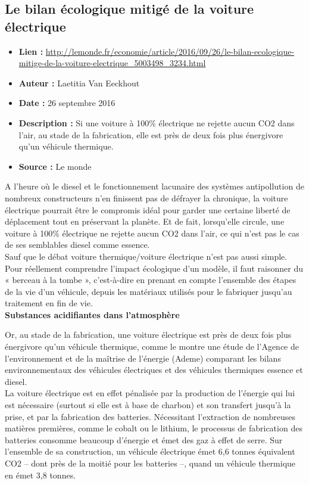 \documentclass[8pt]{article}
\begin{document}
\newpage
\subsection{Le bilan écologique mitigé de la voiture électrique}
 
\begin{itemize}
	\item \textbf{Lien : }  \url{http://lemonde.fr/economie/article/2016/09/26/le-bilan-ecologique-mitige-de-la-voiture-electrique_5003498_3234.html} 
	\item \textbf{Auteur :} Laetitia Van Eeckhout
	\item \textbf{Date : } 26 septembre 2016
	\item \textbf{Description : } Si une voiture à 100\% électrique ne rejette aucun CO2 dans l’air, au stade de la fabrication, elle est près de deux fois plus énergivore qu’un véhicule thermique.
	\item \textbf{Source : } Le monde
\end{itemize}

A l’heure où le diesel et le fonctionnement lacunaire des systèmes antipollution de nombreux constructeurs n’en finissent pas de défrayer la chronique, la voiture électrique pourrait être le compromis idéal pour garder une certaine liberté de déplacement tout en préservant la planète. Et de fait, lorsqu’elle circule, une voiture à 100\% électrique ne rejette aucun CO2 dans l’air, ce qui n’est pas le cas de ses semblables diesel comme essence.  \\

Sauf que le débat voiture thermique/voiture électrique n’est pas aussi simple. Pour réellement comprendre l’impact écologique d’un modèle, il faut raisonner du « berceau à la tombe », c’est-à-dire en prenant en compte l’ensemble des étapes de la vie d’un véhicule, depuis les matériaux utilisés pour le fabriquer jusqu’au traitement en fin de vie.  \\

\textbf{Substances acidifiantes dans l’atmosphère}

Or, au stade de la fabrication, une voiture électrique est près de deux fois plus énergivore qu’un véhicule thermique, comme le montre une étude de l’Agence de l’environnement et de la maîtrise de l’énergie (Ademe) comparant les bilans environnementaux des véhicules électriques et des véhicules thermiques essence et diesel.  \\

La voiture électrique est en effet pénalisée par la production de l’énergie qui lui est nécessaire (surtout si elle est à base de charbon) et son transfert jusqu’à la prise, et par la fabrication des batteries. Nécessitant l’extraction de nombreuses matières premières, comme le cobalt ou le lithium, le processus de fabrication des batteries consomme beaucoup d’énergie et émet des gaz à effet de serre. Sur l’ensemble de sa construction, un véhicule électrique émet 6,6 tonnes équivalent CO2 – dont près de la moitié pour les batteries –, quand un véhicule thermique en émet 3,8 tonnes.  \\
\end{document}
